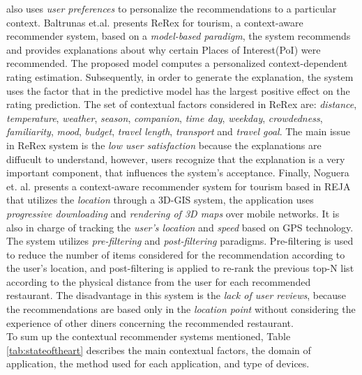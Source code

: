 also uses \textit{user preferences} to personalize the recommendations
to a particular context.
Baltrunas et.al. \cite{baltrunas2011context} presents ReRex for tourism, 
a context-aware recommender system, based on a 
\textit{model-based paradigm}, the system recommends and provides 
explanations about why certain Places of Interest(PoI) were recommended. 
The proposed model computes a 
personalized context-dependent rating estimation. Subsequently, in
order to generate the explanation, the system uses
the factor that in the predictive model has the largest positive
effect on the rating prediction. The set of
contextual factors considered in ReRex are: \textit{distance},
\textit{temperature}, \textit{weather}, \textit{season}, \textit{companion}, 
\textit{time day}, \textit{weekday}, \textit{crowdedness}, \textit{familiarity}, 
\textit{mood}, \textit{budget}, \textit{travel length}, \textit{transport} and
\textit{travel goal}. The main issue in ReRex system is the \textit{low user
satisfaction} because the explanations are diffucult to understand,
however, users recognize that the explanation is a very important
component, that influences the system's acceptance. 
Finally, Noguera et. al. \cite{noguera2012mobile} presents a context-aware
recommender system for tourism based in REJA that utilizes the 
\textit{location} through a 3D-GIS system, the application uses 
\textit{progressive downloading} and \textit{rendering of
3D maps} over mobile networks. It is also in charge of tracking the
\textit{user's location} and \textit{speed} based on GPS technology. 
The system utilizes \textit{pre-filtering} and \textit{post-filtering} paradigms. 
Pre-filtering is used to reduce the number of items considered for the
recommendation according to the user's location, and  post-filtering
is applied to re-rank the previous top-N list according to the
physical distance from the user for each recommended restaurant. The
disadvantage in this system is the \textit{lack of user reviews},
because the recommendations are based only in the \textit{location
point} without considering the experience of other diners concerning the
recommended restaurant.\\ To sum up the contextual recommender 
systems mentioned, Table \ref{tab:stateoftheart} describes the main 
contextual factors, the domain of application, the method used for each 
application, and type of devices.
